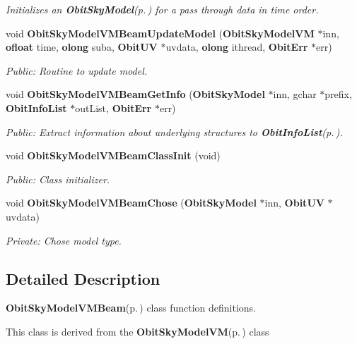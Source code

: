 \begin{CompactItemize}
\begin{CompactList}\small\item\em Initializes an {\bf Obit\-Sky\-Model}{\rm (p.\,\pageref{structObitSkyModel})} for a pass through data in time order. \item\end{CompactList}\item 
void {\bf Obit\-Sky\-Model\-VMBeam\-Update\-Model} ({\bf Obit\-Sky\-Model\-VM} $\ast$inn, {\bf ofloat} time, {\bf olong} suba, {\bf Obit\-UV} $\ast$uvdata, {\bf olong} ithread, {\bf Obit\-Err} $\ast$err)
\begin{CompactList}\small\item\em Public: Routine to update model. \item\end{CompactList}\item 
void {\bf Obit\-Sky\-Model\-VMBeam\-Get\-Info} ({\bf Obit\-Sky\-Model} $\ast$inn, gchar $\ast$prefix, {\bf Obit\-Info\-List} $\ast$out\-List, {\bf Obit\-Err} $\ast$err)
\begin{CompactList}\small\item\em Public: Extract information about underlying structures to {\bf Obit\-Info\-List}{\rm (p.\,\pageref{structObitInfoList})}. \item\end{CompactList}\item 
void {\bf Obit\-Sky\-Model\-VMBeam\-Class\-Init} (void)
\begin{CompactList}\small\item\em Public: Class initializer. \item\end{CompactList}\item 
void {\bf Obit\-Sky\-Model\-VMBeam\-Chose} ({\bf Obit\-Sky\-Model} $\ast$inn, {\bf Obit\-UV} $\ast$uvdata)
\begin{CompactList}\small\item\em Private: Chose model type. \item\end{CompactList}\end{CompactItemize}


\subsection{Detailed Description}
{\bf Obit\-Sky\-Model\-VMBeam}{\rm (p.\,\pageref{structObitSkyModelVMBeam})} class function definitions. 

This class is derived from the {\bf Obit\-Sky\-Model\-VM}{\rm (p.\,\pageref{structObitSkyModelVM})} class

